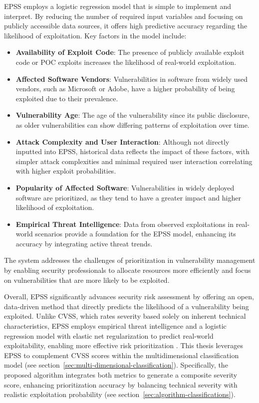 \ac{EPSS} employs a logistic regression model that is simple to implement and interpret. By reducing the number of required input variables and focusing on publicly accessible data sources, it offers high predictive accuracy regarding the likelihood of exploitation. Key factors in the model include:

\begin{itemize}
    \item \textbf{Availability of Exploit Code}: The presence of publicly available exploit code or \ac{POC} exploits increases the likelihood of real-world exploitation.
    \item \textbf{Affected Software Vendors}: Vulnerabilities in software from widely used vendors, such as Microsoft or Adobe, have a higher probability of being exploited due to their prevalence.
    \item \textbf{Vulnerability Age}: The age of the vulnerability since its public disclosure, as older vulnerabilities can show differing patterns of exploitation over time.
    \item \textbf{Attack Complexity and User Interaction}: Although not directly inputted into EPSS, historical data reflects the impact of these factors, with simpler attack complexities and minimal required user interaction correlating with higher exploit probabilities.
    \item \textbf{Popularity of Affected Software}: Vulnerabilities in widely deployed software are prioritized, as they tend to have a greater impact and higher likelihood of exploitation.
    \item \textbf{Empirical Threat Intelligence}: Data from observed exploitations in real-world scenarios provide a foundation for the EPSS model, enhancing its accuracy by integrating active threat trends.
\end{itemize}

The system addresses the challenges of prioritization in vulnerability management by enabling security professionals to allocate resources more efficiently and focus on vulnerabilities that are more likely to be exploited.

Overall, \ac{EPSS} significantly advances security risk assessment by offering an open, data-driven method that directly predicts the likelihood of a vulnerability being exploited. Unlike \ac{CVSS}, which rates severity based solely on inherent technical characteristics, \ac{EPSS} employs empirical threat intelligence and a logistic regression model with elastic net regularization to predict real-world exploitability, enabling more effective risk prioritization \autocite{jacobs_exploit_2021}. This thesis leverages \ac{EPSS} to complement \ac{CVSS} scores within the multidimensional classification model (see section~\ref{sec:multi-dimensional-classification}). Specifically, the proposed algorithm integrates both metrics to generate a composite severity score, enhancing prioritization accuracy by balancing technical severity with realistic exploitation probability (see section~\ref{sec:algorithm-classifications}).

